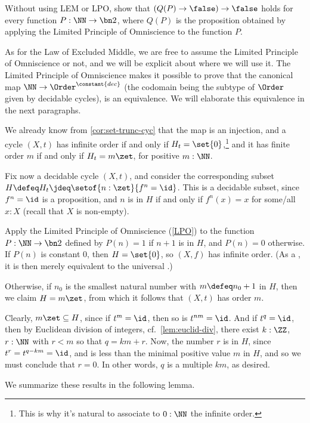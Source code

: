 \begin{xca}\label{xca:not-not-lpoP}
  Without using LEM or LPO, show that $(Q(P)\to\false)\to\false$ holds
  for every function $P:\NN\to\bn 2$, where $Q(P)$ is the proposition obtained
  by applying the Limited Principle of Omniscience to the function $P$.
\end{xca}

As for the Law of Excluded Middle, we are free to assume the Limited Principle of Omniscience 
or not, and we will be explicit about where we will use it. 
The Limited Principle of Omniscience makes it possible to prove that the canonical map
$\NN \to \Order^{\constant{dec}}$
(the codomain being the subtype of $\Order$ given by decidable cycles),
is an equivalence.
We will elaborate this equivalence in the next paragraphs.

We already know from \cref{cor:set-trunc-cyc} that the map is an injection,
and a cycle $(X,t)$ has infinite order
if and only if $H_t=\set{0}$,\footnote{%
  This is why it's natural to associate to $0:\NN$
  the infinite order.}
and it has finite order $m$
if and only if $H_t=m\zet$, for positive $m:\NN$.

Fix now a decidable cycle $(X,t)$,
and consider the corresponding subset $H \defeq H_t \jdeq \setof{n:\zet}{f^n=\id}$.
This is a decidable subset, since $f^n=\id$ is a proposition, and $n$ is in $H$
if and only if $f^n(x)=x$ for some/all $x:X$ (recall that $X$ is non-empty).

Apply the Limited Principle of Omniscience (\cref{LPO}) to the function $P:\NN\to\bn 2$ defined
by $P(n)=1$ if $n+1$ is in $H$, and $P(n)=0$ otherwise.
If $P(n)$ is constant $0$, then $H=\set{0}$,
so $(X,f)$ has infinite order.
(As a \covering, it is then merely equivalent to the universal \covering.)

Otherwise, if $n_0$ is the smallest natural number with $m\defeq n_0+1$ in $H$,
then we claim $H=m\zet$,
from which it follows that $(X,t)$ has order $m$.

Clearly, $m\zet \subseteq H$, since if $t^m=\id$, then so is $t^{nm}=\id$.
And if $t^q=\id$, then by Euclidean division of integers, cf.~\cref{lem:euclid-div},
there exist $k:\ZZ$, $r:\NN$ with $r<m$ so that $q=km+r$.
Now, the number $r$ is in $H$, since $t^r=t^{q-km}=\id$,
and is less than the minimal positive value $m$ in $H$,
and so we must conclude that $r=0$.
In other words, $q$ is a multiple $km$, as desired.

We summarize these results in the following lemma.

